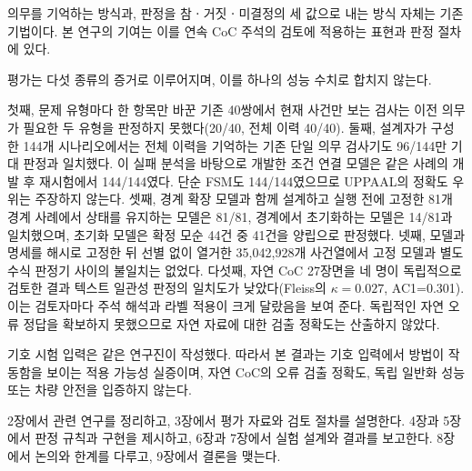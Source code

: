 \begin{revision}
의무를 기억하는 방식과, 판정을 참ㆍ거짓ㆍ미결정의 세 값으로 내는 방식 자체는 기존 기법이다. 본 연구의 기여는 이를 연속 CoC 주석의 검토에 적용하는 표현과 판정 절차에 있다.

평가는 다섯 종류의 증거로 이루어지며, 이를 하나의 성능 수치로 합치지 않는다.

첫째, 문제 유형마다 한 항목만 바꾼 기존 40쌍에서 현재 사건만 보는 검사는 이전 의무가 필요한 두 유형을 판정하지 못했다(20/40, 전체 이력 40/40). 둘째, 설계자가 구성한 144개 시나리오에서는 전체 이력을 기억하는 기존 단일 의무 검사기도 96/144만 기대 판정과 일치했다. 이 실패 분석을 바탕으로 개발한 조건 연결 모델은 같은 사례의 개발 후 재시험에서 144/144였다. 단순 FSM도 144/144였으므로 UPPAAL의 정확도 우위는 주장하지 않는다. 셋째, 경계 확장 모델과 함께 설계하고 실행 전에 고정한 81개 경계 사례에서 상태를 유지하는 모델은 81/81, 경계에서 초기화하는 모델은 14/81과 일치했으며, 초기화 모델은 확정 모순 44건 중 41건을 양립으로 판정했다. 넷째, 모델과 명세를 해시로 고정한 뒤 선별 없이 열거한 35,042,928개 사건열에서 고정 모델과 별도 수식 판정기 사이의 불일치는 없었다. 다섯째, 자연 CoC 27장면을 네 명이 독립적으로 검토한 결과 텍스트 일관성 판정의 일치도가 낮았다(Fleiss의 $\kappa=0.027$, AC1=0.301). 이는 검토자마다 주석 해석과 라벨 적용이 크게 달랐음을 보여 준다. 독립적인 자연 오류 정답을 확보하지 못했으므로 자연 자료에 대한 검출 정확도는 산출하지 않았다.

기호 시험 입력은 같은 연구진이 작성했다. 따라서 본 결과는 기호 입력에서 방법이 작동함을 보이는 적용 가능성 실증이며, 자연 CoC의 오류 검출 정확도, 독립 일반화 성능 또는 차량 안전을 입증하지 않는다.

2장에서 관련 연구를 정리하고, 3장에서 평가 자료와 검토 절차를 설명한다. 4장과 5장에서 판정 규칙과 구현을 제시하고, 6장과 7장에서 실험 설계와 결과를 보고한다. 8장에서 논의와 한계를 다루고, 9장에서 결론을 맺는다.
\end{revision}
